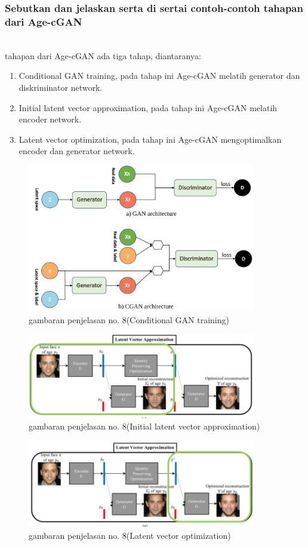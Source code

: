 \subsubsection{Sebutkan dan jelaskan serta di sertai contoh-contoh tahapan dari Age-cGAN}
\hfill\\
tahapan dari Age-cGAN ada tiga tahap, diantaranya:
\begin{enumerate}
\item Conditional GAN training, pada tahap ini Age-cGAN melatih generator dan diskriminator network.
\item Initial latent vector approximation, pada tahap ini Age-cGAN melatih encoder network.
\item Latent vector optimization, pada tahap ini Age-cGAN mengoptimalkan encoder dan generator network.
\end{enumerate}

\begin{figure}[H]
	\centering
	\includegraphics[width=10cm]{figures/1174083/figures9/8.png}
	\caption{gambaran penjelasan no. 8(Conditional GAN training)}
\end{figure}
\begin{figure}[H]
	\centering
	\includegraphics[width=10cm]{figures/1174083/figures9/8a.png}
	\caption{gambaran penjelasan no. 8(Initial latent vector approximation)}
\end{figure}
\begin{figure}[H]
	\centering
	\includegraphics[width=10cm]{figures/1174083/figures9/8b.png}
	\caption{gambaran penjelasan no. 8(Latent vector optimization)}
\end{figure}

